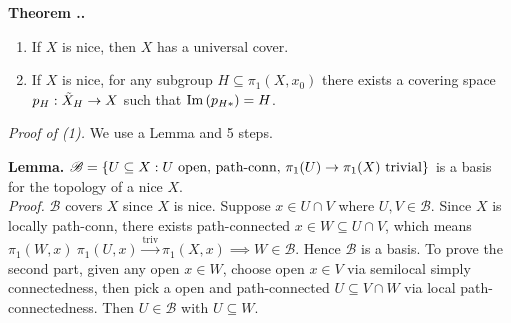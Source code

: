 \documentclass{natsirt}
\newcommand{\scr}{\mathscr}
\newcounter{thm}[section]
\newenvironment{thmbox}[1][]{
\begin{greenbox}[#1]\refstepcounter{thm}\textbf{Theorem \thesection.\thethm. }}{\end{greenbox}}
\begin{document}
\begin{thmbox}
    \begin{enumerate}
        \item If $X$ is nice, then $X$ has a universal cover.
        \item If $X$ is nice, for any subgroup $H\subseteq \pi_1(X,x_0)$ there exists a covering space $p_H: \Tilde{X}_H\> X$ such that $\text{Im}\pr{p_{H*}} = H$.
    \end{enumerate}
\end{thmbox}
\textit{Proof of (1).} We use a Lemma and 5 steps.
\begin{whitebox}
    \textbf{Lemma.} $\scr{B} = \set{U\subseteq X: U\text{ open, path-conn, $\pi_1(U)\>\pi_1(X)$ trivial}}$ is a basis for the topology of a nice $X$.\vspace{0.3cm}\\
    \textit{Proof.} $\scr{B}$ covers $X$ since $X$ is nice. Suppose $x\in U\cap V$ where $U,V\in \scr{B}$. Since $X$ is locally path-conn, there exists path-connected $x\in W\subseteq U\cap V$, which means $\pi_1(W,x)\> \pi_1(U,x) \xrightarrow{\text{triv}} \pi_1(X,x) \implies W\in \scr{B}$. Hence $\scr{B}$ is a basis. To prove the second part, given any open $x\in W$, choose open $x\in V$ via semilocal simply connectedness, then pick a open and path-connected $U\subseteq V\cap W$ via local path-connectedness. Then $U\in \scr{B}$ with $U\subseteq W$. \QED
\end{whitebox}
\end{document}
